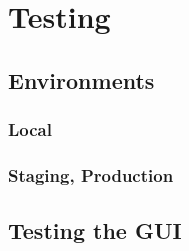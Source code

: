 
\chapter{Testing}
\label{chap:testing}

\section{Environments}
\label{sec:environments}
\subsection{Local}
\label{subsec:local}
\subsection{Staging, Production}
\label{subsec:staging-production}

\section{Testing the GUI}
\label{sec:testing-gui}
\section{}